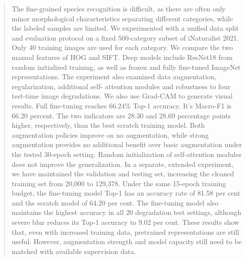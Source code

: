 %
%
%
%

\begin{abstract}
The fine-grained species recognition is difficult, as there are often only
minor morphological characteristics separating different categories, while the
labeled samples are limited. We experimented with a unified data split and
evaluation protocol on a fixed 500-category subset of iNaturalist 2021. Only
40 training images are used for each category. We compare the two manual
features of HOG and SIFT. Deep models include ResNet18 from random initialized
training, as well as frozen and fully fine-tuned ImageNet representations. The
experiment also examined data augmentation, regularization, additional self-
attention modules and robustness to four test-time image degradations. We also
use Grad-CAM to generate visual results. Full fine-tuning reaches 66.24\%
Top-1 accuracy. It's Macro-F1 is 66.20 percent. The two indicators are 28.30
and 28.69 percentage points higher, respectively, than the best scratch
training model. Both augmentation policies improve on no augmentation, while
strong augmentation provides no additional benefit over basic augmentation
under the tested 30-epoch setting. Random initialization of self-attention
modules does not improve the generalization. In a separate, extended experiment, we
have maintained the validation and testing set, increasing the cleaned
training set from 20,000 to 129,378. Under the same 15-epoch training budget,
the fine-tuning model Top-1 has an accuracy rate of 81.58 per cent and the
scratch model of 64.20 per cent. The fine-tuning model also maintains the
highest accuracy in all 20 degradation test settings, although severe blur
reduces its Top-1 accuracy to 9.02 per cent. These results show that, even
with increased training data, pretrained representations are still useful.
However, augmentation strength and model capacity still need to be matched
with available supervision data.
\end{abstract}

